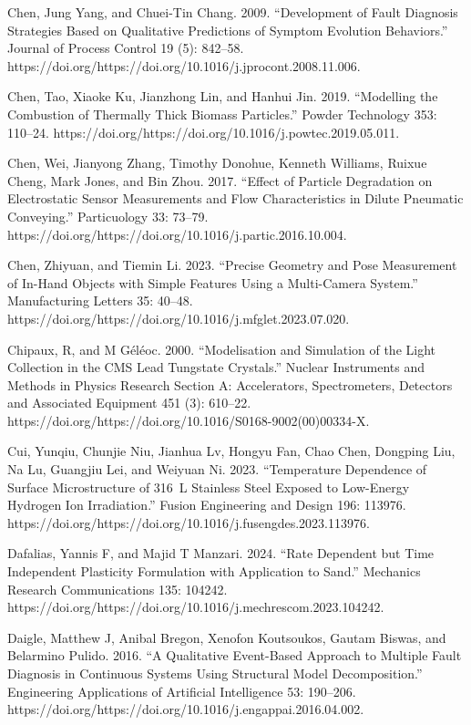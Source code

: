\documentclass[utf8]{gradu3}
\begin{document}
Chen, Jung Yang, and Chuei-Tin Chang. 2009. “Development of Fault Diagnosis Strategies Based on Qualitative Predictions of Symptom Evolution Behaviors.” Journal of Process Control 19 (5): 842–58. https://doi.org/https://doi.org/10.1016/j.jprocont.2008.11.006.

Chen, Tao, Xiaoke Ku, Jianzhong Lin, and Hanhui Jin. 2019. “Modelling the Combustion of Thermally Thick Biomass Particles.” Powder Technology 353: 110–24. https://doi.org/https://doi.org/10.1016/j.powtec.2019.05.011.

Chen, Wei, Jianyong Zhang, Timothy Donohue, Kenneth Williams, Ruixue Cheng, Mark Jones, and Bin Zhou. 2017. “Effect of Particle Degradation on Electrostatic Sensor Measurements and Flow Characteristics in Dilute Pneumatic Conveying.” Particuology 33: 73–79. https://doi.org/https://doi.org/10.1016/j.partic.2016.10.004.

Chen, Zhiyuan, and Tiemin Li. 2023. “Precise Geometry and Pose Measurement of In-Hand Objects with Simple Features Using a Multi-Camera System.” Manufacturing Letters 35: 40–48. https://doi.org/https://doi.org/10.1016/j.mfglet.2023.07.020.

Chipaux, R, and M Géléoc. 2000. “Modelisation and Simulation of the Light Collection in the CMS Lead Tungstate Crystals.” Nuclear Instruments and Methods in Physics Research Section A: Accelerators, Spectrometers, Detectors and Associated Equipment 451 (3): 610–22. https://doi.org/https://doi.org/10.1016/S0168-9002(00)00334-X.

Cui, Yunqiu, Chunjie Niu, Jianhua Lv, Hongyu Fan, Chao Chen, Dongping Liu, Na Lu, Guangjiu Lei, and Weiyuan Ni. 2023. “Temperature Dependence of Surface Microstructure of 316 L Stainless Steel Exposed to Low-Energy Hydrogen Ion Irradiation.” Fusion Engineering and Design 196: 113976. https://doi.org/https://doi.org/10.1016/j.fusengdes.2023.113976.

Dafalias, Yannis F, and Majid T Manzari. 2024. “Rate Dependent but Time Independent Plasticity Formulation with Application to Sand.” Mechanics Research Communications 135: 104242. https://doi.org/https://doi.org/10.1016/j.mechrescom.2023.104242.

Daigle, Matthew J, Anibal Bregon, Xenofon Koutsoukos, Gautam Biswas, and Belarmino Pulido. 2016. “A Qualitative Event-Based Approach to Multiple Fault Diagnosis in Continuous Systems Using Structural Model Decomposition.” Engineering Applications of Artificial Intelligence 53: 190–206. https://doi.org/https://doi.org/10.1016/j.engappai.2016.04.002.
\end{document}
